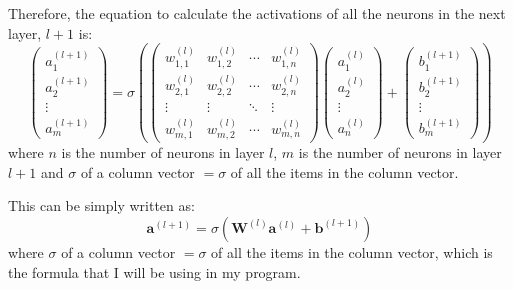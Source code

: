 \documentclass[12pt]{report}
\begin{document}
Therefore, the equation to calculate the activations of all the neurons in the next layer, $l+1$ is:
\begin{equation}
    \begin{pmatrix}a^{\left(l+1\right)}_1\\[0.3em]a^{\left(l+1\right)}_2\\\vdots \\a^{\left(l+1\right)}_m\end{pmatrix}=\sigma \left(\begin{pmatrix}w^{\left(l\right)}_{1,1}&w^{\left(l\right)}_{1,2}&\cdots&w^{\left(l\right)}_{1,n}\\[0.3em]w^{\left(l\right)}_{2,1}&w^{\left(l\right)}_{2,2}&\cdots&w^{\left(l\right)}_{2,n}\\\vdots&\vdots&\ddots&\vdots\\w^{\left(l\right)}_{m,1}&w^{\left(l\right)}_{m,2}&\cdots&w^{\left(l\right)}_{m,n}\end{pmatrix}\begin{pmatrix}a^{\left(l\right)}_1\\[0.3em]a^{\left(l\right)}_2\\\vdots \\a^{\left(l\right)}_n\end{pmatrix}+\begin{pmatrix}b^{\left(l+1\right)}_1\\[0.3em]b^{\left(l+1\right)}_2\\\vdots \\b^{\left(l+1\right)}_m\end{pmatrix}\right)
\end{equation}
where $n$ is the number of neurons in layer $l$, $m$ is the number of neurons in layer $l+1$ and $\sigma$ of a column vector $=\sigma$ of all the items in the column vector.

This can be simply written as:
\begin{equation}\label{eq:activationOfLayer}
    \mathbf{a}^{\left(l+1\right)}=\sigma \left(\mathbf{W}^{\left(l\right)}\mathbf{a}^{\left(l\right)}+\mathbf{b}^{\left(l+1\right)}\right)
\end{equation}
where $\sigma$ of a column vector $=\sigma$ of all the items in the column vector, which is the formula that I will be using in my program.
\end{document}
